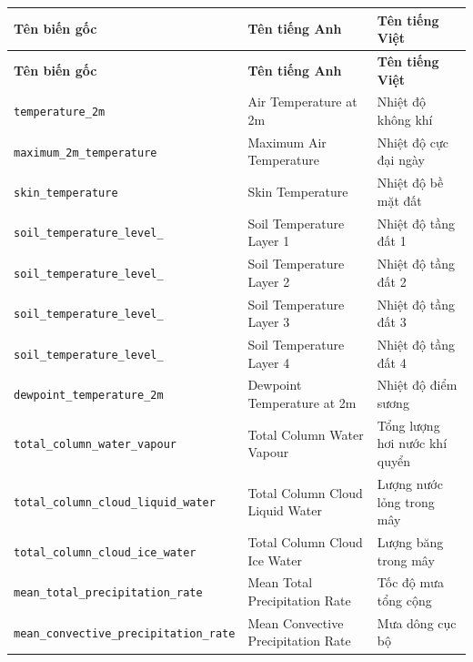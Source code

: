 \documentclass[12pt,a4paper]{article}
\begin{document}
\begingroup
\setlength{\parskip}{0pt}
\setlength{\LTpre}{0pt}
\setlength{\LTpost}{0pt}
\begin{longtable}{|>{\raggedright\arraybackslash}p{}|>{\raggedright\arraybackslash}p{}|>{\raggedright\arraybackslash}p{}|}
\hline
\textbf{Tên biến gốc} & \textbf{Tên tiếng Anh} & \textbf{Tên tiếng Việt} \\
\hline
\endfirsthead
\hline
\textbf{Tên biến gốc} & \textbf{Tên tiếng Anh} & \textbf{Tên tiếng Việt} \\
\hline
\endhead

\texttt{temperature\_\allowbreak 2m} & Air Temperature at 2m & Nhiệt độ không khí \\
\texttt{maximum\_\allowbreak 2m\_\allowbreak temperature} & Maximum Air Temperature & Nhiệt độ cực đại ngày \\
\texttt{skin\_\allowbreak temperature} & Skin Temperature & Nhiệt độ bề mặt đất \\
\hline

\texttt{soil\_\allowbreak temperature\_\allowbreak level\_\allowbreak 1} & Soil Temperature Layer 1 & Nhiệt độ tầng đất 1 \\
\texttt{soil\_\allowbreak temperature\_\allowbreak level\_\allowbreak 2} & Soil Temperature Layer 2 & Nhiệt độ tầng đất 2 \\
\texttt{soil\_\allowbreak temperature\_\allowbreak level\_\allowbreak 3} & Soil Temperature Layer 3 & Nhiệt độ tầng đất 3 \\
\texttt{soil\_\allowbreak temperature\_\allowbreak level\_\allowbreak 4} & Soil Temperature Layer 4 & Nhiệt độ tầng đất 4 \\
\hline

\texttt{dewpoint\_\allowbreak temperature\_\allowbreak 2m} & Dewpoint Temperature at 2m & Nhiệt độ điểm sương \\
\hline

\texttt{total\_\allowbreak column\_\allowbreak water\_\allowbreak vapour} & Total Column Water Vapour & Tổng lượng hơi nước khí quyển \\
\texttt{total\_\allowbreak column\_\allowbreak cloud\_\allowbreak liquid\_\allowbreak water} & Total Column Cloud Liquid Water & Lượng nước lỏng trong mây \\
\texttt{total\_\allowbreak column\_\allowbreak cloud\_\allowbreak ice\_\allowbreak water} & Total Column Cloud Ice Water & Lượng băng trong mây \\
\hline

\texttt{mean\_\allowbreak total\_\allowbreak precipitation\_\allowbreak rate} & Mean Total Precipitation Rate & Tốc độ mưa tổng cộng \\
\texttt{mean\_\allowbreak convective\_\allowbreak precipitation\_\allowbreak rate} & Mean Convective Precipitation Rate & Mưa dông cục bộ \\
\hline


\end{longtable}
\end{document}
